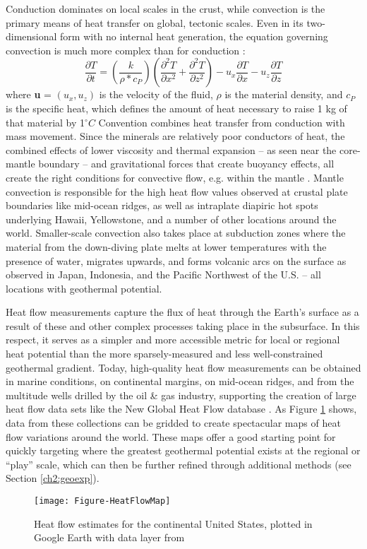 Conduction dominates on local scales in the crust, while convection is the primary means of heat transfer on global, tectonic scales. Even in its two-dimensional form with no internal heat generation, the equation governing convection is much more complex than for conduction \citep[~p. 355]{lowrie_fundamentals_2007}:
\begin{equation}\label{eq:convection}
\frac{\partial T}{\partial t} = \left (\frac{k}{\rho * c_P}\right)\left (\frac{\partial ^2T}{\partial x^2}+\frac{\partial ^2T}{\partial z^2}\right)-u_x\frac{\partial T}{\partial x}-u_z\frac{\partial T}{\partial z}
\end{equation}
where \textbf{u} = \(( u_x, u_z)\) is the velocity of the fluid, \(\rho\) is the material density, and \(c_P\) is the specific heat, which defines the amount of heat necessary to raise 1 kg of that material by 1\(^\circ C\) Convention combines heat transfer from conduction with mass movement. Since the minerals are relatively poor conductors of heat, the combined effects of lower viscosity and thermal expansion – as seen near the core-mantle boundary – and gravitational forces that create buoyancy effects, all create the right conditions for convective flow, e.g. within the mantle \citep[~p. 25]{glassley_geothermal_2015}. Mantle convection is responsible for the high heat flow values observed at crustal plate boundaries like mid-ocean ridges, as well as intraplate diapiric hot spots underlying Hawaii, Yellowstone, and a number of other locations around the world.  Smaller-scale convection also takes place at subduction zones where the material from the down-diving plate melts at lower temperatures with the presence of water, migrates upwards, and forms volcanic arcs on the surface as observed in Japan, Indonesia, and the Pacific Northwest of the U.S. \citep[~p. 31-33]{press_understanding_2004} – all locations with geothermal potential.

Heat flow measurements capture the flux of heat through the Earth’s surface as a result of these and other complex processes taking place in the subsurface. In this respect, it serves as a simpler and more accessible metric for local or regional heat potential than the more sparsely-measured and less well-constrained geothermal gradient. Today, high-quality heat flow measurements can be obtained in marine conditions, on continental margins, on mid-ocean ridges, and from the multitude wells drilled by the oil \& gas industry, supporting the creation of large heat flow data sets like the New Global Heat Flow database \citep{lucazeau_analysis_2019}. As Figure \ref{fig:heatflow} shows, data from these collections can be gridded to create spectacular maps of heat flow variations around the world. These maps offer a good starting point for quickly targeting where the greatest geothermal potential exists at the regional or “play” scale, which can then be further refined through additional methods (see Section \ref{ch2:geoexp}).
\begin{figure}[h!]
\centering
\texttt{[image: Figure-HeatFlowMap]}
\caption[Heat flow across the continental U.S.]{Heat flow estimates for the continental United States, plotted in Google Earth with data layer from \protect\citep{lucazeau_analysis_2019}}
\label{fig:heatflow}
\end{figure}
